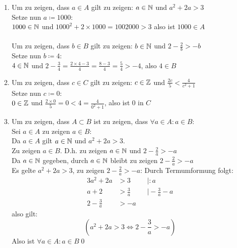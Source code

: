 \documentclass{gadsescript}
\begin{document}
\maketitle
\begin{enumerate}[label=(\alph*)]
	\item Um zu zeigen, dass $ a \in A $ gilt zu zeigen: $ a \in \mathbb{N} $ und $  a^2 + 2a > 3 $\\
		Setze nun $ a \coloneqq 1000 $:\\
		$ 1000 \in \mathbb{N} $ und $ 1000^2 +2 \times 1000 = 1002000 > 3 $ also ist $ 1000 \in A $\\
		~\\
		Um zu zeigen, dass $ b \in B $ gilt zu zeigen: $ b \in \mathbb{N} $ und $  2 - \frac{2}{b} > -b $\\
		Setze nun $ b \coloneqq 4 $:\\
		$4 \in \mathbb{N} $ und $ 2 - \frac{3}{4} = \frac{2\times 4 - 3}{4} = \frac{8-3}{4} = \frac{5}{4} > -4 $, also $ 4 \in B $
	\item \label{item:b}Um zu zeigen, dass $ c \in C $ gilt zu zeigen: $ c \in \mathbb{Z} $ und $ \frac{2c}{5} < \frac{4}{c^2+1}  $\\
		Setze nun $ c \coloneqq 0 $:\\
		$ 0 \in \mathbb{Z} $ und $ \frac{2\times0}{5} = 0 < 4 = \frac{4}{0^2 + 1} $, also ist $ 0 $ in $ C $
	\item \label{item:c}Um zu zeigen, dass $ A \subset B $ ist zu zeigen, dass $ \forall a \in A: a \in B $:\\
		Sei $ a \in A $ zu zeigen $ a \in B $:\\
		Da $ a \in A $ gilt $ a \in \mathbb{N} $ und $ a^2 + 2a > 3 $.\\
		Zu zeigen $ a \in B $. D.h. zu zeigen $ a \in \mathbb{N} $ und $  2 - \frac{2}{a} > -a $\\
		Da $ a \in \mathbb{N} $ gegeben, durch $ a \in \mathbb{N} $ bleibt zu zeigen $  2 - \frac{2}{a} > -a $\\
		Es gelte $ a^2 + 2a > 3 $, zu zeigen $  2 - \frac{2}{a} > -a $:
		Durch Termumformung folgt:
		\begin{alignat*}{3}
			a^2 + 2a &> 3&&\mid :a\\
			a + 2 &> \frac{3}{a} &&\mid -\frac{3}{a} - a\\
			2 - \frac{3}{a} &> -a &&~
		\end{alignat*}
		also gilt:
		\begin{equation}
			\label{eq:1}
			( a^2 + 2a > 3 \iff 2 - \frac{3}{a} > -a )
		\end{equation}
		Also ist $ \forall a \in A: a \in B $\qed

\end{enumerate}
\end{document}
